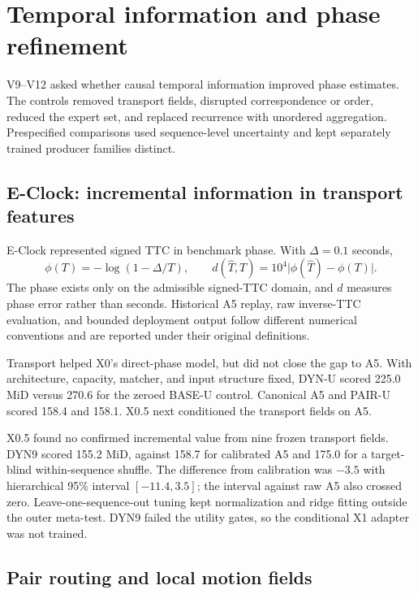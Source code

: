 \section{Temporal information and phase refinement}
\label{sec:temporal-recovery}

V9--V12 asked whether causal temporal information improved phase estimates. The controls removed transport fields, disrupted correspondence or order, reduced the expert set, and replaced recurrence with unordered aggregation. Prespecified comparisons used sequence-level uncertainty and kept separately trained producer families distinct.

\subsection{E-Clock: incremental information in transport features}

E-Clock represented signed TTC in benchmark phase. With $\Delta=0.1$ seconds,
\begin{equation}
 \phi(T)=-\log(1-\Delta/T),\qquad
 d(\hat T,T)=10^4\lvert\phi(\hat T)-\phi(T)\rvert.
\end{equation}
The phase exists only on the admissible signed-TTC domain, and $d$ measures phase error rather than seconds. Historical A5 replay, raw inverse-TTC evaluation, and bounded deployment output follow different numerical conventions and are reported under their original definitions.

Transport helped X0's direct-phase model, but did not close the gap to A5. With architecture, capacity, matcher, and input structure fixed, DYN-U scored 225.0 MiD versus 270.6 for the zeroed BASE-U control. Canonical A5 and PAIR-U scored 158.4 and 158.1. X0.5 next conditioned the transport fields on A5. 

X0.5 found no confirmed incremental value from nine frozen transport fields. DYN9 scored 155.2 MiD, against 158.7 for calibrated A5 and 175.0 for a target-blind within-sequence shuffle. The difference from calibration was $-3.5$ with hierarchical 95\% interval $[-11.4,3.5]$; the interval against raw A5 also crossed zero. Leave-one-sequence-out tuning kept normalization and ridge fitting outside the outer meta-test. DYN9 failed the utility gates, so the conditional X1 adapter was not trained. 

\subsection{Pair routing and local motion fields}

